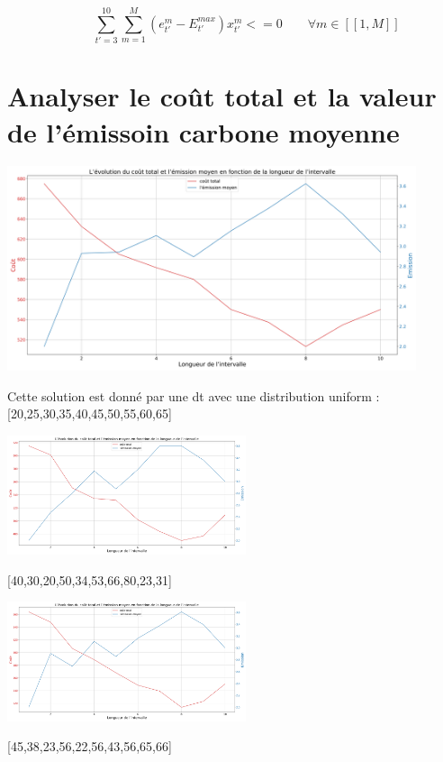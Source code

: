\documentclass[12pt,a4paper]{article}
\begin{document}
\[
	\qquad \sum_{t'=3}^{10}\sum_{m=1}^M(e_{t'}^m-E^{max}_{t'})x_{t'}^m<=0\qquad \forall m \in [\![1,M]\!]
\]
\newpage
\section{Analyser le coût total et la valeur de l'émissoin carbone moyenne}

 \begin{minipage}[r]{.99\linewidth}
	\center\includegraphics[width=12cm]{img/10-4-3/10-4-3.png}
\begin{center}
Cette solution est donné par une dt avec une distribution uniform :
[20,25,30,35,40,45,50,55,60,65]
\end{center}

\end{minipage}
\begin{minipage}[b]{.48\linewidth}
	\center\includegraphics[width=7cm]{img/10-4-3/10-4-3-1.png}
	\begin{center}
	[40,30,20,50,34,53,66,80,23,31]
	\end{center}
\end{minipage}
\begin{minipage}[b]{.48\linewidth}
	\center\includegraphics[width=7cm]{img/10-4-3/10-4-3-2.png}
	\begin{center}
	[45,38,23,56,22,56,43,56,65,66]
\end{center}
\end{minipage}
\end{document}
